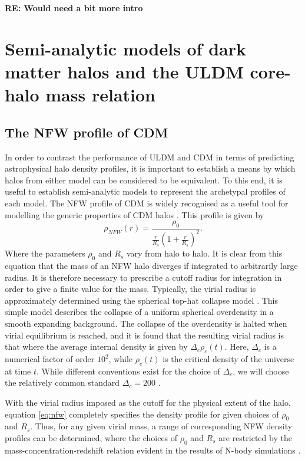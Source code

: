 \documentclass[a4paper,11pt]{article}
\newcommand{\re}[1]{{{\bf \color{green} RE: #1}}}
\begin{document}
\re{Would need a bit more intro}







\section{Semi-analytic models of dark matter halos and the ULDM core-halo mass relation}

\subsection{The NFW profile of CDM}

In order to contrast the performance of ULDM and CDM in terms of predicting astrophysical halo density profiles, it is important to establish a means by which halos from either model can be considered to be equivalent. To this end, it is useful to establish semi-analytic models to represent the archetypal profiles of each model. The NFW profile of CDM is widely recognised as a useful tool for modelling the generic properties of CDM halos \cite{Navarro:1995iw, Maccio:2008pcd}. This profile is given by
\begin{equation}\label{eq:nfw}
    \rho_{NFW}(r)=\frac{\rho_0}{\frac{r}{R_s}\left(1+\frac{r}{R_s}\right)^2}.
\end{equation}
Where the parameters $\rho_0$ and $R_s$ vary from halo to halo. It is clear from this equation that the mass of an NFW halo diverges if integrated to arbitrarily large radius. It is therefore necessary to prescribe a cutoff radius for integration in order to give a finite value for the mass. Typically, the virial radius is approximately determined using the spherical top-hat collapse model \cite{White:2000jv, Suto:2015jdt, Herrera:2017epn}. This simple model describes the collapse of a uniform spherical overdensity in a smooth expanding background. The collapse of the overdensity is halted when virial equilibrium is reached, and it is found that the resulting virial radius is that where the average internal density is given by $\Delta_c \rho_c(t)$. Here, $\Delta_c$ is a numerical factor of order $10^2$, while $\rho_c(t)$ is the critical density of the universe at time $t$. While different conventions exist for the choice of $\Delta_c$, we will choose the relatively common standard $\Delta_c = 200$ \cite{Richings:2018}. 

With the virial radius imposed as the cutoff for the physical extent of the halo, equation \ref{eq:nfw} completely specifies the density profile for given choices of $\rho_0$ and $R_s$. Thus, for any given virial mass, a range of corresponding NFW density profiles can be determined, where the choices of $\rho_0$ and $R_s$ are restricted by the mass-concentration-redshift relation evident in the results of N-body simulations \cite{Ludlow:2013vxa}. 
\end{document}

